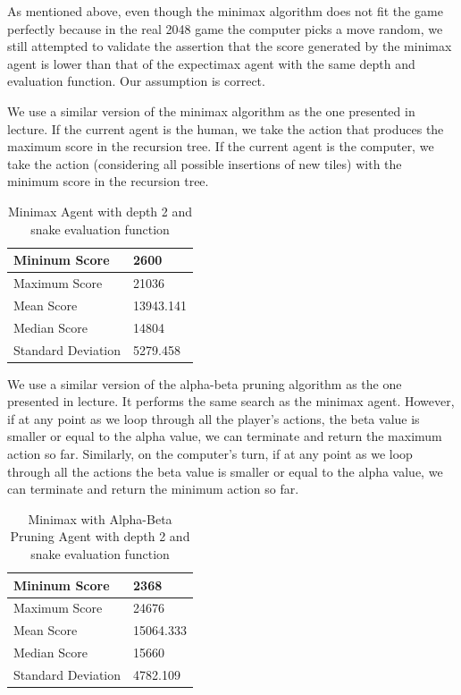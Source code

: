 \documentclass[9pt,twocolumn]{article}
\begin{document}
As mentioned above, even though the minimax algorithm does not fit the game perfectly because in the real 2048 game the computer picks a move random, we still attempted to validate the assertion that the score generated by the minimax agent is lower than that of the expectimax agent with the same depth and evaluation function. Our assumption is correct.

We use a similar version of the minimax algorithm as the one presented in lecture. If the current agent is the human, we take the action that produces the maximum score in the recursion tree. If the current agent is the computer, we take the action (considering all possible insertions of new tiles) with the minimum score in the recursion tree.

\begin{table}[!htbp]

\centering

\begin{tabular}{|l|l|}
\hline
Mininum Score      & 2600 \\ \hline
Maximum Score      & 21036 \\ \hline
Mean Score         & 13943.141 \\ \hline
Median Score       & 14804 \\ \hline
Standard Deviation & 5279.458 \\ \hline
\end{tabular}

\caption{Minimax Agent with depth 2 and snake evaluation function}

\end{table}

We use a similar version of the alpha-beta pruning algorithm as the one presented in lecture. It performs the same search as the minimax agent. However, if at any point as we loop through all the player's actions, the beta value is smaller or equal to the alpha value, we can terminate and return the maximum action so far. Similarly, on the computer's turn, if at any point as we loop through all the actions the beta value is smaller or equal to the alpha value, we can terminate and return the minimum action so far.

\begin{table}[!htbp]

\centering

\begin{tabular}{|l|l|}
\hline
Mininum Score      & 2368 \\ \hline
Maximum Score      & 24676 \\ \hline
Mean Score         & 15064.333 \\ \hline
Median Score       & 15660 \\ \hline
Standard Deviation & 4782.109 \\ \hline
\end{tabular}

\caption{Minimax with Alpha-Beta Pruning Agent with depth 2 and snake evaluation function}

\end{table}
\end{document}
